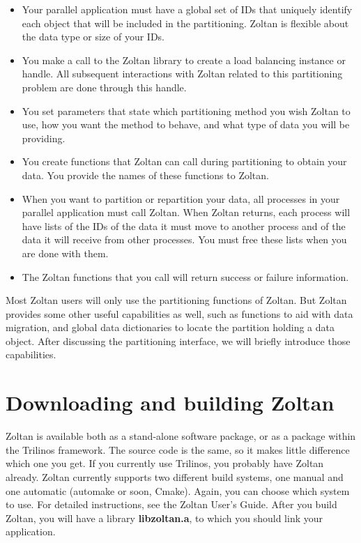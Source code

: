 \begin{itemize}
\item Your parallel application must have a global set of IDs that uniquely identify each object that will be included in the partitioning.  Zoltan is flexible about the data type or size of your IDs.
\item You make a call to the Zoltan library to create a load balancing instance or handle.  All subsequent interactions with Zoltan related to this partitioning problem are done through this handle.  
\item You set parameters that state which partitioning method you wish Zoltan to use, how you want the method to behave, and what type of data you will be providing.
\item You create functions that Zoltan can call during partitioning to obtain your data.  You provide the names of these functions to Zoltan.
\item When you want to partition or repartition your data, all processes in your parallel application must call Zoltan.  When Zoltan returns, each process will have lists of the 
IDs of the data it must move to another process and of the data it will receive from 
other processes.  You must free these lists when you are done with them.
\item The Zoltan functions that you call will return success or failure information.
\end{itemize}

Most Zoltan users will only use the partitioning functions of Zoltan.  But Zoltan provides
some other useful capabilities as well, such as functions to aid with data migration, and
global data dictionaries to locate the partition holding a data object.  
After discussing the partitioning interface, we will briefly introduce those capabilities.

\section{Downloading and building Zoltan}

Zoltan is available both as a stand-alone software package, or
as a package within the Trilinos framework. The source code
is the same, so it makes little difference which one you get.
If you currently use Trilinos, you probably have Zoltan already.
Zoltan currently supports two different build systems, one manual
and one automatic (automake or soon, Cmake). Again, you can choose
which system to use. For detailed instructions, see the Zoltan User's Guide.
After you build Zoltan, you will have a library \textbf{libzoltan.a},
to which you should link your application. 


